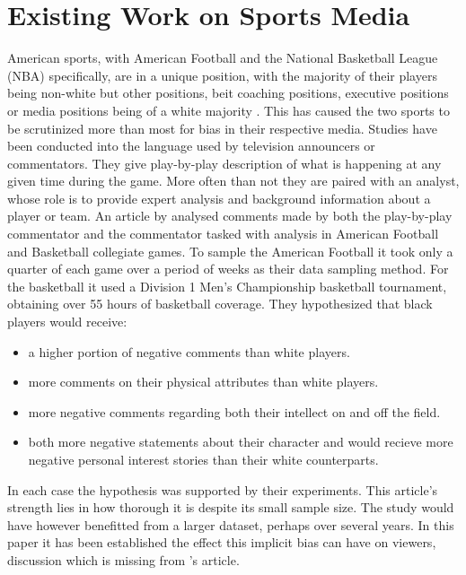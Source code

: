\documentclass[oneside,12pt]{Classes/RoboticsLaTeX}
\begin{document}
\section{Existing Work on Sports Media}
American sports, with American Football and the National Basketball League (NBA) specifically, are in a unique position, with the majority
of their players being non-white but other positions, beit coaching positions, executive positions or media positions being of a white majority \citep{Lapchick2020}.
This has caused the two sports to be scrutinized more than most for bias in their respective media.
Studies have been conducted into the language used by television announcers or commentators. They give play-by-play description of what is happening at any given
time during the game. More often than not they are paired with an analyst, whose role is to provide expert analysis and background information about a player or team. 
An article by \citep{ColorCoded} analysed comments made by both the play-by-play commentator and the commentator tasked with analysis in American Football and Basketball collegiate games.
To sample the American Football it took only a quarter of each game over a period of weeks as their data sampling method.
For the basketball it used a Division 1 Men's Championship basketball tournament, obtaining over 55 hours of basketball coverage. 
They hypothesized that black players would receive:
\begin{itemize}
  \item a higher portion of negative comments than white players.
  \item more comments on their physical attributes than white players.
  \item more negative comments regarding both their intellect on and off the field.
  \item both more negative statements about their character and would recieve more negative personal interest stories than their white counterparts.
\end{itemize}
In each case the hypothesis was supported by their experiments.
This article's strength lies in how thorough it is despite its small sample size. The study would have however benefitted from a larger dataset, perhaps over
several years. In this paper it has been established the effect this implicit bias can have on viewers, discussion which is missing from \citet{ColorCoded}'s article.
\end{document}
